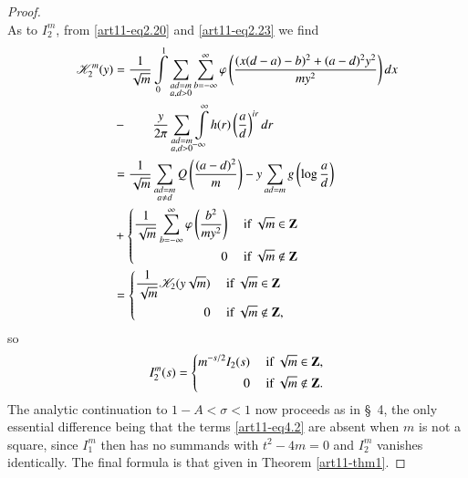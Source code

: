 \begin{proof}
$$$$
As to $I^m_2$, from \eqref{art11-eq2.20} and \eqref{art11-eq2.23} we find 
\begin{align*}
\mathscr{K}^m_2 (y) & = \frac{1}{\sqrt{m}} \int\limits^1_0 \sum\limits_{\substack{ad=m\\ a, d>0}} \sum\limits^\infty_{b = - \infty} \varphi \left(\frac{(x (d-a) -b)^2 + (a-d)^2 y^2}{my^2} \right) dx \\
& - \qquad \frac{y}{2\pi} \sum\limits_{\substack{ad =m\\ a, d>0}} \int\limits^\infty_{-\infty} h(r) \left(\frac{a}{d} \right)^{ir} dr \\
& = \frac{1}{\sqrt{m}} \sum\limits_{\substack{ad = m\\ a\neq d}} Q \left(\frac{(a-d)^2}{m} \right) -y \sum\limits_{ad = m} g \left(\log \frac{a}{d} \right)\\
& + 
\left\{
\begin{aligned}
\frac{1}{\sqrt{m}} \sum\limits^\infty_{b = - \infty} \varphi \left(\frac{b^2}{my^2} \right) &\quad \text{ if } \sqrt{m} \in \mathbf{Z}\\
0& \quad \text{ if }\sqrt{m} \not\in \mathbf{Z}
\end{aligned}
\right.\\
& = 
\left\{
\begin{aligned}
\frac{1}{\sqrt{m}} \mathscr{K}_2 (y \sqrt{m}) & \quad  \text{ if } \sqrt{m} \in \mathbf{Z}\\
0 & \quad \text{ if } \sqrt{m} \not\in \mathbf{Z},
\end{aligned}
\right.
\end{align*}
so\pageoriginale 
$$
I^m_2 (s) = 
\left\{ 
\begin{aligned}
m^{-s/2} I_2 (s) & \quad \text{ if } \sqrt{m} \in \mathbf{Z},\\
0 & \quad \text{ if } \sqrt{m} \not\in \mathbf{Z}.
\end{aligned}
\right.
$$
The analytic continuation to $1 - A < \sigma <1 $ now proceeds as in \S~4, the only essential difference being that the terms \eqref{art11-eq4.2} are absent when $m$ is not a square, since $I^m_1$ then has no summands with $t^2 - 4 m = 0$ and $I^m_2$ vanishes identically. The final formula is that given in Theorem \ref{art11-thm1}.


\end{proof}
